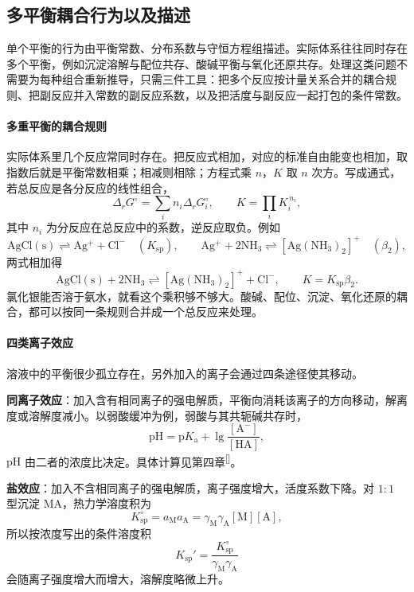 \documentclass[UTF8]{ctexbook}
\begin{document}
\subsection{多平衡耦合行为以及描述}

单个平衡的行为由平衡常数、分布系数与守恒方程组描述。实际体系往往同时存在多个平衡，例如沉淀溶解与配位共存、酸碱平衡与氧化还原共存。处理这类问题不需要为每种组合重新推导，只需三件工具：把多个反应按计量关系合并的耦合规则、把副反应并入常数的副反应系数，以及把活度与副反应一起打包的条件常数。

\paragraph{多重平衡的耦合规则}

实际体系里几个反应常同时存在。把反应式相加，对应的标准自由能变也相加，取指数后就是平衡常数相乘；相减则相除；方程式乘 \(n\)，\(K\) 取 \(n\) 次方。写成通式，若总反应是各分反应的线性组合，
\[
\Delta_rG^\circ=\sum_i n_i\Delta_rG_i^\circ,
\qquad
K=\prod_i K_i^{\,n_i},
\]
其中 \(n_i\) 为分反应在总反应中的系数，逆反应取负。例如
\[
\mathrm{AgCl(s)}\rightleftharpoons\mathrm{Ag^+}+\mathrm{Cl^-}\quad(K_{\mathrm{sp}}),
\qquad
\mathrm{Ag^+}+2\mathrm{NH_3}\rightleftharpoons[\mathrm{Ag(NH_3)_2}]^+\quad(\beta_2),
\]
两式相加得
\[
\mathrm{AgCl(s)}+2\mathrm{NH_3}\rightleftharpoons[\mathrm{Ag(NH_3)_2}]^++\mathrm{Cl^-},
\qquad
K=K_{\mathrm{sp}}\beta_2 .
\]
氯化银能否溶于氨水，就看这个乘积够不够大。酸碱、配位、沉淀、氧化还原的耦合，都可以按同一条规则合并成一个总反应来处理。

\paragraph{四类离子效应}

溶液中的平衡很少孤立存在，另外加入的离子会通过四条途径使其移动。

\textbf{同离子效应}：加入含有相同离子的强电解质，平衡向消耗该离子的方向移动，解离度或溶解度减小。以弱酸缓冲为例，弱酸与其共轭碱共存时，
\[
\mathrm{pH}=\mathrm{p}K_{\mathrm{a}}+\lg\frac{[\mathrm{A^-}]}{[\mathrm{HA}]},
\]
\(\mathrm{pH}\) 由二者的浓度比决定。具体计算见第四章\textsuperscript{[\pageref{sec:buffer-ph}]}。

\textbf{盐效应}：加入不含相同离子的强电解质，离子强度增大，活度系数下降。对 \(1:1\) 型沉淀 \(\mathrm{MA}\)，热力学溶度积为
\[
K_{\mathrm{sp}}^\circ=a_{\mathrm{M}}a_{\mathrm{A}}
=\gamma_{\mathrm{M}}\gamma_{\mathrm{A}}[\mathrm{M}][\mathrm{A}],
\]
所以按浓度写出的条件溶度积
\[
K_{\mathrm{sp}}'=\frac{K_{\mathrm{sp}}^\circ}{\gamma_{\mathrm{M}}\gamma_{\mathrm{A}}}
\]
会随离子强度增大而增大，溶解度略微上升。
\end{document}
